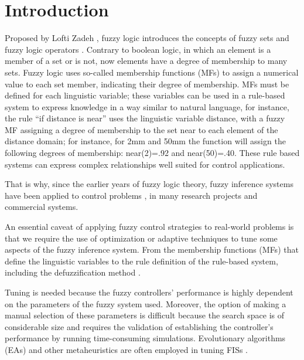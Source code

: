 \documentclass[symmetry,article,submit,moreauthors,pdftex]{Definitions/mdpi}
\begin{document}
\section{Introduction}

Proposed by Lofti Zadeh \cite{goguen_zadeh_1973}, fuzzy logic introduces the
concepts of fuzzy sets and fuzzy logic operators \cite{zadeh1996fuzzy}.
Contrary to boolean logic, in which an element is a member of a set or is not,
now elements have a degree of membership to many sets. Fuzzy logic uses
so-called membership functions (MFs) to assign a numerical value to each set
member, indicating their degree of membership. MFs must be defined for each
linguistic variable; these variables can be used in a rule-based system to
express knowledge in a way similar to natural language, for instance, the rule
``if distance is near'' uses the linguistic variable distance, with a fuzzy MF
assigning a degree of membership to the set near to each element of the
distance domain; for instance, for 2mm and 50mm the function will assign the
following degrees of membership: near(2)=.92 and near(50)=.40. These rule based
systems can express complex relationships well suited for control applications.

That is why, since the earlier years of fuzzy logic theory, fuzzy inference
systems \cite{driankov_introduction_2013} have been applied to control problems
\cite{mamdani1974application,king1977application,passino1998fuzzy,driankov_introduction_2013},
in many research projects \cite{yang_improved_2003,driankov_fuzzy_2013} and
commercial systems.

An essential caveat of applying fuzzy control strategies to real-world problems
is that we require the use of optimization or adaptive techniques to tune some
aspects of the fuzzy inference system.  From the membership functions (MFs)
that define the linguistic variables to the rule definition of the rule-based
system, including the defuzzification method
\cite{xia2019command,isaka1988design}. 

Tuning is needed because the fuzzy controllers' performance is highly dependent
on the parameters of the fuzzy system used. Moreover, the option of making a
manual selection of these parameters is difficult because the search space is
of considerable size and requires the validation of establishing the
controller's performance by running time-consuming simulations.  Evolutionary
algorithms (EAs) and other metaheuristics are often employed in tuning FISs %
\cite{martinez-soto_bio-inspired_2012}. 
\end{document}
